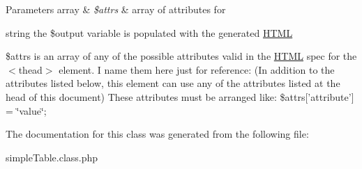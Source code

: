 \begin{DoxyParams}[1]{Parameters}
array & {\em \$attrs} & array of attributes for \begin{TabularC}{0}
\hline
\end{TabularC}
string the \$output variable is populated with the generated \hyperlink{class_h_t_m_l}{H\-T\-M\-L} \\
\hline
\end{DoxyParams}
\$attrs is an array of any of the possible attributes valid in the \hyperlink{class_h_t_m_l}{H\-T\-M\-L} spec for the $<$thead$>$ element. I name them here just for reference\-: (In addition to the attributes listed below, this element can use any of the attributes listed at the head of this document) These attributes must be arranged like\-: \$attrs\mbox{[}'attribute'\mbox{]} = \char`\"{}value\char`\"{};

The documentation for this class was generated from the following file\-:\begin{DoxyCompactItemize}
\item 
simple\-Table.\-class.\-php\end{DoxyCompactItemize}
